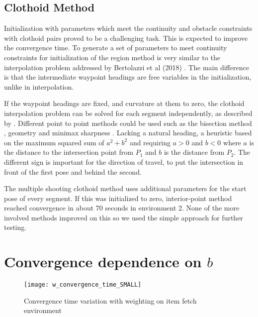 \subsection{Clothoid Method}
Initialization with parameters which meet the continuity and obstacle constraints with clothoid pairs proved to be a challenging task. This is expected to improve the convergence time. To generate a set of parameters to meet continuity constraints for initialization of the region method is very similar to the interpolation problem addressed by Bertolazzi et al (2018) \cite{Bertolazzi2018}. The main difference is that the intermediate waypoint headings are free variables in the initialization, unlike in interpolation.

If the waypoint headings are fixed, and curvature at them to zero, the clothoid interpolation problem can be solved for each segment independently, as described by \cite{Gim2017a}. Different point to point methods could be used such as the bisection method \cite{Gim2017b}, geometry \cite{Vazquez-Mendez2016} and minimax sharpness \cite{Henrie2007}. Lacking a natural heading, a heuristic based on the maximum squared sum of $a^2 + b^2$ and requiring $a>0$ and $b<0$ where $a$ is the distance to the intersection point from $P_1$ and $b$ is the distance from $P_2$. The different sign is important for the direction of travel, to put the intersection in front of the first pose and behind the second.

The multiple shooting clothoid method uses additional parameters for the start pose of every segment. If this was initialized to zero, interior-point method reached convergence in about 70 seconds in environment 2. None of the more involved methods improved on this so we used the simple approach for further testing.  

\section{Convergence dependence on $b$}
\begin{figure}
	\texttt{[image: w\_convergence\_time\_SMALL]}
	\label{fig:w_convergence}
	\caption{Convergence time variation with weighting on item fetch environment}
\end{figure}

